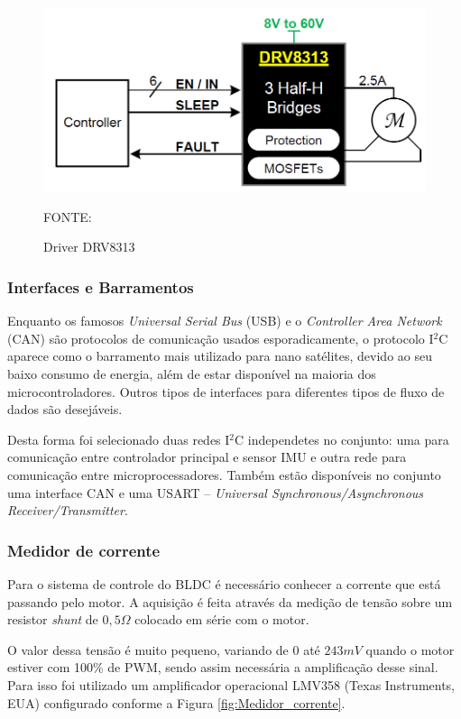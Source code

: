 \documentclass[
	12pt,				%
	openany,			%
	twoside,			%
	a4paper,			%
	english,			%
	french,				%
	spanish,			%
	brazil,				%
	oldfontcommands
	]{abntex2}
\begin{document}
\begin{figure}[th]
	\caption{Driver DRV8313}
	\centering
	\includegraphics[width=0.6\linewidth]{./figs/DRV8313-fig}
	
	\begin{small}
		FONTE: \cite{DRV8313}
	\end{small}
	\label{fig:Driver}
\end{figure}

\newpage

\subsubsection{Interfaces e Barramentos}

Enquanto os famosos \textit{Universal Serial Bus} (USB) e o \textit{Controller Area Network} (CAN) são protocolos de comunicação usados esporadicamente, o protocolo I$^{2}$C aparece como o barramento mais utilizado para nano satélites, devido ao seu baixo consumo de energia, além de estar disponível na maioria dos microcontroladores. Outros tipos de interfaces para diferentes tipos de fluxo de dados são desejáveis. \cite{STATEOFART}

Desta forma foi selecionado duas redes I$^{2}$C independetes no conjunto: uma para comunicação entre controlador principal e sensor IMU e outra rede para comunicação entre microprocessadores. Também estão disponíveis no conjunto uma interface CAN e uma USART – \textit{Universal Synchronous/Asynchronous Receiver/Transmitter}.

\subsubsection{Medidor de corrente}

Para o sistema de controle do BLDC é necessário conhecer a corrente que está passando pelo motor. A aquisição é feita através da medição de tensão sobre um resistor \textit{shunt} de $0,5\Omega$ colocado  em série com o motor. 

O valor dessa tensão é muito pequeno, variando de $0$ até $243mV$ quando o motor estiver com 100\% de PWM, sendo assim necessária a amplificação desse sinal. Para isso foi utilizado um amplificador operacional LMV358 (Texas Instruments, EUA) configurado conforme a Figura \ref{fig:Medidor_corrente}.
\end{document}
